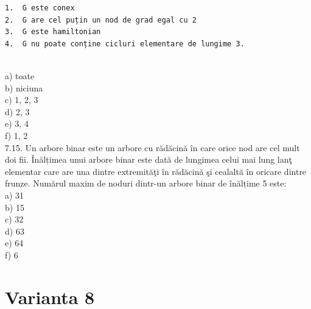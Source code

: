\begin{verbatim}
1.  G este conex  
2.  G are cel puțin un nod de grad egal cu 2  
3.  G este hamiltonian  
4.  G nu poate conține cicluri elementare de lungime 3. 
\end{verbatim}
\\
a) toate
\\
b) niciuna
\\
c) 1, 2, 3
\\
d) 2, 3
\\
e) 3, 4
\\
f) 1, 2
\\
7.15. Un arbore binar este un arbore cu rădăcină în care orice nod are cel mult doi fii. Înălțimea unui arbore binar este dată de lungimea celui mai lung lanţ elementar care are una dintre extremităţi în rădăcină şi cealaltă în oricare dintre frunze. Numărul maxim de noduri dintr-un arbore binar de înălțime 5 este:
\\
a) 31
\\
b) 15
\\
c) 32
\\
d) 63
\\
e) 64
\\
f) 6
\\

\section*{Varianta 8}

